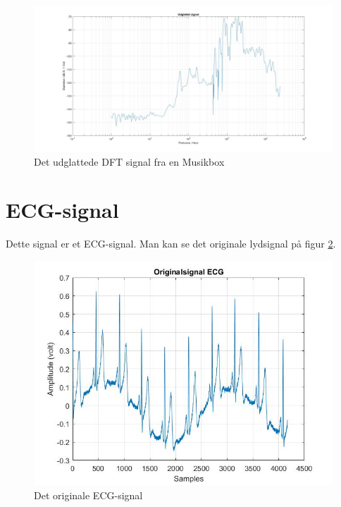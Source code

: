 \begin{figure}[H]
	\centering
	\includegraphics[width=130mm]{figures/Musikbox/udglattet.jpg}
	\caption{Det udglattede DFT signal fra en Musikbox}
	\label{fig:Musikbox udglattet}
\end{figure}
\newpage
\section{ECG-signal}
Dette signal er et ECG-signal. Man kan se det originale lydsignal på figur \ref{fig:ECG original}.
\begin{figure}[H]
	\centering
	\includegraphics[width=140mm]{figures/ECG/original.jpg}
	\caption{Det originale ECG-signal}
	\label{fig:ECG original}
\end{figure}

